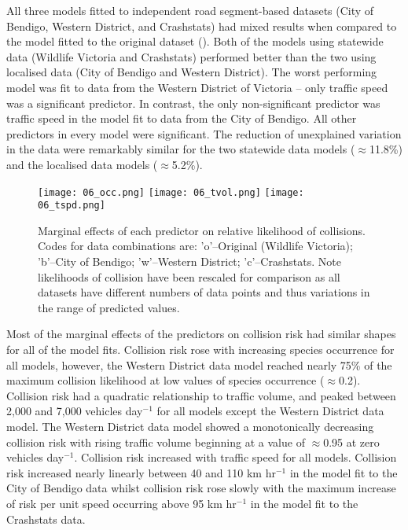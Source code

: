 All three models fitted to independent road segment-based datasets (City of Bendigo, Western District, and Crashstats) had mixed results when compared to the model fitted to the original dataset (). Both of the models using statewide data (Wildlife Victoria and Crashstats) performed better than the two using localised data (City of Bendigo and Western District). The worst performing model was fit to data from the Western District of Victoria -- only traffic speed was a significant predictor. In contrast, the only non-significant predictor was traffic speed in the model fit to data from the City of Bendigo. All other predictors in every model were significant. The reduction of unexplained variation in the data were remarkably similar for the two statewide data models ($\approx$11.8\%) and the localised data models ($\approx$5.2\%).

\begin{figure*}[htp]
  \centering
  \texttt{[image: 06\_occ.png]}
  \texttt{[image: 06\_tvol.png]}
  \texttt{[image: 06\_tspd.png]}
  \caption[Marginal effects of predictor variables on relative likelihood of collision using independent datasets to train models]{Marginal effects of each predictor on relative likelihood of collisions. Codes for data combinations are: 'o'--Original (Wildlife Victoria); 'b'--City of Bendigo; 'w'--Western District; 'c'--Crashstats. Note likelihoods of collision have been rescaled for comparison as all datasets have different numbers of data points and thus variations in the range of predicted values.}
  \label{val_effects}
\end{figure*}

Most of the marginal effects of the predictors on collision risk had similar shapes for all of the model fits. Collision risk rose with increasing species occurrence for all models, however, the Western District data model reached nearly 75\% of the maximum collision likelihood at low values of species occurrence ($\approx$0.2). Collision risk had a quadratic relationship to traffic volume, and peaked between 2,000 and 7,000 vehicles day$^{-1}$ for all models except the Western District data model. The Western District data model showed a monotonically decreasing collision risk with rising traffic volume beginning at a value of $\approx$0.95 at zero vehicles day$^{-1}$. Collision risk increased with traffic speed for all models. Collision risk increased nearly linearly between 40 and 110 km hr$^{-1}$ in the model fit to the City of Bendigo data whilst collision risk rose slowly with the maximum increase of risk per unit speed occurring above 95 km hr$^{-1}$ in the model fit to the Crashstats data.

